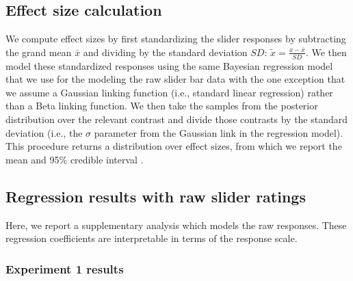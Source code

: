 \documentclass[floatsintext,doc]{apa6}
\begin{document}
\subsection{Effect size calculation}


We compute effect sizes by first standardizing the slider responses by subtracting the grand mean $\bar{x}$ and dividing by the standard deviation $SD$:  $\tilde{x} = \frac{x - \bar{x}}{SD}$.
We then model these standardized responses using the same Bayesian regression model that we use for the modeling the raw slider bar data with the one exception that we assume a Gaussian linking function (i.e., standard linear regression) rather than a Beta linking function. 
We then take the samples from the posterior distribution over the relevant contrast and divide those contrasts by the standard deviation (i.e., the $\sigma$ parameter from the Gaussian link in the regression model). 
This procedure returns a distribution over effect sizes, from which we report the mean and 95\% credible interval \cite{kruschke2014doing}. 

\subsection{Regression results with raw slider ratings}

Here, we report a supplementary analysis which models the raw responses. 
These regression coefficients are interpretable in terms of the response scale. 

\subsubsection{Experiment 1 results}
\end{document}

